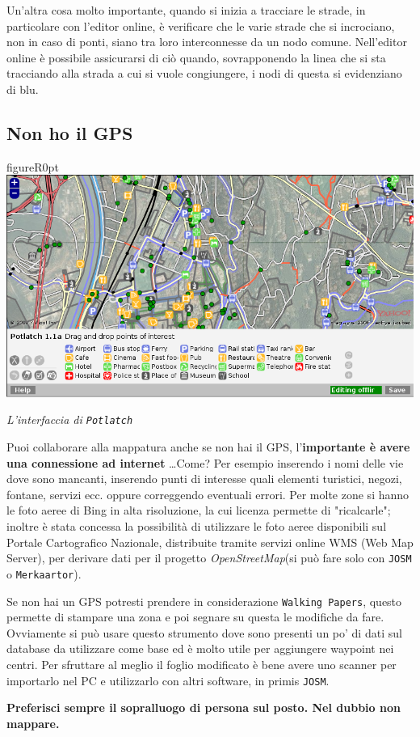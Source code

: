 \documentclass[a4paper,twoside,12pt,]{article}
\newcommand{\osm}{\emph{OpenStreetMap}\xspace}
\newcommand{\gps}{GPS\xspace}
\newcommand{\soft}[1]{\texttt{#1}}
\begin{document}
Un'altra cosa molto importante, quando si inizia a tracciare le strade, in particolare con l'editor online, è verificare che le varie strade che si incrociano, non in caso di ponti, siano tra loro interconnesse da un nodo comune. Nell'editor online è possibile assicurarsi di ciò quando, sovrapponendo la linea che si sta tracciando alla strada a cui si vuole congiungere, i nodi di questa si evidenziano di blu.
\subsection{Non ho il \gps}
\begin{wrapfloat}{figure}{R}{0pt}
 \includegraphics[width=0.7\columnwidth]{potlatch.png}
 \caption{\textit{L'interfaccia di \soft{Potlatch}}}
\end{wrapfloat}
Puoi collaborare alla mappatura anche se non hai il \gps, l'\textbf{importante è avere una connessione ad internet} \dots Come? Per esempio inserendo i nomi delle vie dove sono mancanti, inserendo punti di interesse quali elementi turistici, negozi, fontane, servizi ecc. oppure correggendo eventuali errori. Per molte zone si hanno le foto aeree di Bing in alta risoluzione, la cui licenza permette di "ricalcarle"; inoltre è stata concessa la possibilità di utilizzare le foto aeree disponibili sul Portale Cartografico Nazionale, distribuite tramite servizi online WMS (Web Map Server), per derivare dati per il progetto \osm (si può fare solo con \soft{JOSM} o \soft{Merkaartor}). 

Se non hai un \gps potresti prendere in considerazione \soft{Walking Papers}, questo permette di stampare una zona e poi segnare su questa le modifiche da fare. Ovviamente si può usare questo strumento dove sono presenti un po' di dati sul database da utilizzare come base ed è molto utile per aggiungere waypoint nei centri. Per sfruttare al meglio il foglio modificato è bene avere uno scanner per importarlo nel PC e utilizzarlo con altri software, in primis \soft{JOSM}.

\textbf{Preferisci sempre il sopralluogo di persona sul posto. Nel dubbio non mappare.}
\end{document}

